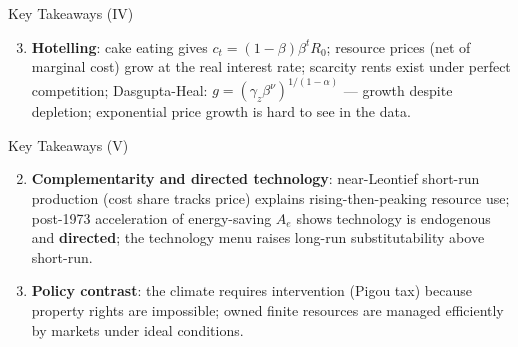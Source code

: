 \documentclass[blue]{beamer}
\begin{document}
\begin{frame}{Key Takeaways (IV)}
\begin{enumerate}
    \setcounter{enumi}{2}
    \item \textbf{Hotelling}: cake eating gives $c_t = (1-\beta)\beta^tR_0$; resource prices (net of marginal cost) grow at the real interest rate; scarcity rents exist under perfect competition; Dasgupta-Heal: $g = (\gamma_z\beta^{\nu})^{1/(1-\alpha)}$ --- growth despite depletion; exponential price growth is hard to see in the data.

\end{enumerate}
\end{frame}

\begin{frame}{Key Takeaways (V)}
\begin{enumerate}
    \setcounter{enumi}{1}
    \item \textbf{Complementarity and directed technology}: near-Leontief short-run production (cost share tracks price) explains rising-then-peaking resource use; post-1973 acceleration of energy-saving $A_e$ shows technology is endogenous and \textbf{directed}; the technology menu raises long-run substitutability above short-run.

    \item \textbf{Policy contrast}: the climate requires intervention (Pigou tax) because property rights are impossible; owned finite resources are managed efficiently by markets under ideal conditions.
\end{enumerate}
\end{frame}
\end{document}
